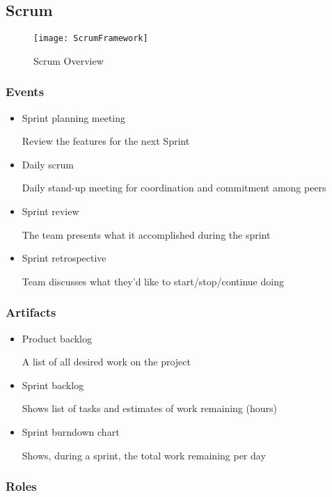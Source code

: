 \documentclass[../ESOF_notes.tex]{subfiles}
\begin{document}
 

\subsection{Scrum}

\begin{figure}[H]
    \centering
    \texttt{[image: ScrumFramework]}
    \caption{Scrum Overview}
\end{figure}

\subsubsection{Events}

\begin{itemize}
    \item Sprint planning meeting
    
    Review the features for the next Sprint
    \item Daily scrum
    
    Daily stand-up meeting for coordination and commitment among peers
    \item Sprint review
    
    The team presents what it accomplished during the sprint
    \item Sprint retrospective
    
    Team discusses what they'd like to start/stop/continue doing
\end{itemize}

\subsubsection{Artifacts}

\begin{itemize}
    \item Product backlog
    
    A list of all desired work on the project
    \item Sprint backlog
    
    Shows list of tasks and estimates of work remaining (hours)
    \item Sprint burndown chart
    
    Shows, during a sprint, the total work remaining per day
\end{itemize}

\subsubsection{Roles}
\end{document}
